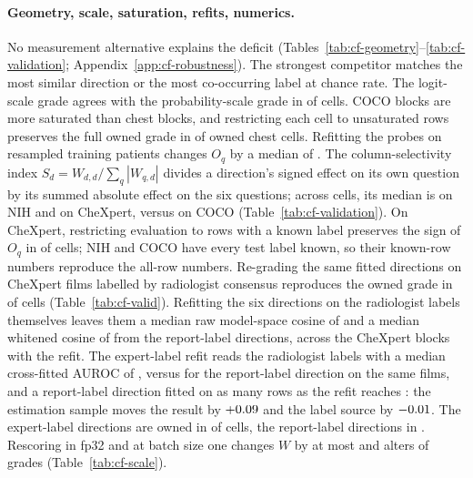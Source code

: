 \label{sec:robust-geometry}

\paragraph{Geometry, scale, saturation, refits, numerics.} No measurement alternative explains the deficit (Tables~\ref{tab:cf-geometry}--\ref{tab:cf-validation}; Appendix~\ref{app:cf-robustness}). The strongest competitor matches the most similar direction or the most co-occurring label at chance rate. The logit-scale grade agrees with the probability-scale grade in \cfScaleAgree{} of \cfScaleAgreeN{} cells. COCO blocks are more saturated than chest blocks, and restricting each cell to unsaturated rows preserves the full owned grade in \cfScaleUnsatGradeKept{} of \cfScaleUnsatGradeN{} owned chest cells. Refitting the probes on resampled training patients changes $O_q$ by a median of \cfScaleRefitMedian{}. The column-selectivity index $S_d=W_{d,d}/\sum_q|W_{q,d}|$ divides a direction's signed effect on its own question by its summed absolute effect on the six questions; across cells, its median is \cfValColSelNih{} on NIH and \cfValColSelChex{} on CheXpert, versus \cfValColSelCoco{} on COCO (Table~\ref{tab:cf-validation}). On CheXpert, restricting evaluation to rows with a known label preserves the sign of $O_q$ in \cfValKnownSignAgree{} of \cfValKnownN{} cells; NIH and COCO have every test label known, so their known-row numbers reproduce the all-row numbers. Re-grading the same fitted directions on \cfValidRows{} CheXpert films labelled by radiologist consensus \citep{irvin2019chexpert} reproduces the owned grade in \cfValidOwnedAgree{} of \cfValidCells{} cells (Table~\ref{tab:cf-valid}). Refitting the six directions on the radiologist labels themselves leaves them a median raw model-space cosine of \cfValidfitCosRaw{} and a median whitened cosine of \cfValidfitCosWhitened{} from the report-label directions, across the \cfValidfitBlocks{} CheXpert blocks with the refit. The expert-label refit reads the radiologist labels with a median cross-fitted AUROC of \cfValidfitAurocExpert{}, versus \cfValidfitAurocReportDir{} for the report-label direction on the same films, and a report-label direction fitted on as many rows as the refit reaches \cfVfArmReportSubAuroc{}: the estimation sample moves the result by $+0.09$ and the label source by $-0.01$. The expert-label directions are owned in \cfValidfitOwnedExpert{} of \cfValidfitCells{} cells, the report-label directions in \cfValidfitOwnedReport{}. Rescoring in fp32 and at batch size one changes $W$ by at most \cfPrecisionMaxDW{} and alters \cfPrecisionGradeChanges{} of \cfPrecisionGradeCells{} grades (Table~\ref{tab:cf-scale}).

